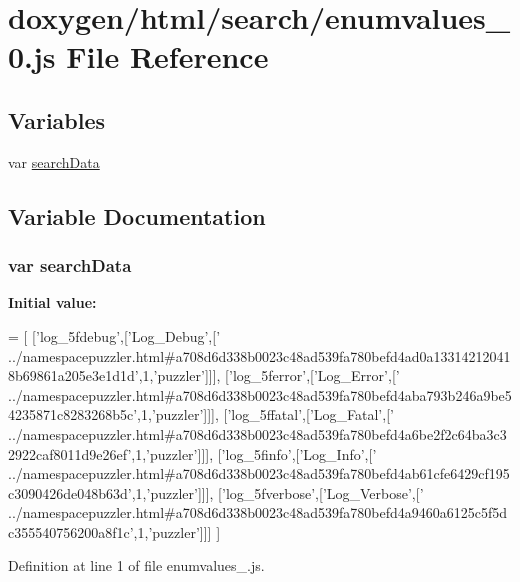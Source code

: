 \hypertarget{a00072}{}\section{doxygen/html/search/enumvalues\+\_\+0.js File Reference}
\label{a00072}
\subsection*{Variables}
\begin{DoxyCompactItemize}
\item 
var \hyperlink{a00072_ad01a7523f103d6242ef9b0451861231e}{search\+Data}
\end{DoxyCompactItemize}


\subsection{Variable Documentation}
\hypertarget{a00072_ad01a7523f103d6242ef9b0451861231e}{}
\subsubsection[{search\+Data}]{\setlength{\rightskip}{0pt plus 5cm}var search\+Data}\label{a00072_ad01a7523f103d6242ef9b0451861231e}
{\bfseries Initial value\+:}
\begin{DoxyCode}
=
[
  [\textcolor{stringliteral}{'log\_5fdebug'},[\textcolor{stringliteral}{'Log\_Debug'},[\textcolor{stringliteral}{'
      ../namespacepuzzler.html#a708d6d338b0023c48ad539fa780befd4ad0a133142120418b69861a205e3e1d1d'},1,\textcolor{stringliteral}{'puzzler'}]]],
  [\textcolor{stringliteral}{'log\_5ferror'},[\textcolor{stringliteral}{'Log\_Error'},[\textcolor{stringliteral}{'
      ../namespacepuzzler.html#a708d6d338b0023c48ad539fa780befd4aba793b246a9be54235871c8283268b5c'},1,\textcolor{stringliteral}{'puzzler'}]]],
  [\textcolor{stringliteral}{'log\_5ffatal'},[\textcolor{stringliteral}{'Log\_Fatal'},[\textcolor{stringliteral}{'
      ../namespacepuzzler.html#a708d6d338b0023c48ad539fa780befd4a6be2f2c64ba3c32922caf8011d9e26ef'},1,\textcolor{stringliteral}{'puzzler'}]]],
  [\textcolor{stringliteral}{'log\_5finfo'},[\textcolor{stringliteral}{'Log\_Info'},[\textcolor{stringliteral}{'
      ../namespacepuzzler.html#a708d6d338b0023c48ad539fa780befd4ab61cfe6429cf195c3090426de048b63d'},1,\textcolor{stringliteral}{'puzzler'}]]],
  [\textcolor{stringliteral}{'log\_5fverbose'},[\textcolor{stringliteral}{'Log\_Verbose'},[\textcolor{stringliteral}{'
      ../namespacepuzzler.html#a708d6d338b0023c48ad539fa780befd4a9460a6125c5f5dc355540756200a8f1c'},1,\textcolor{stringliteral}{'puzzler'}]]]
]
\end{DoxyCode}


Definition at line 1 of file enumvalues\+\_.\+js.

